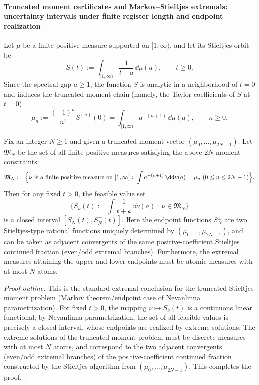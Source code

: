 \paragraph{Truncated moment certificates and Markov--Stieltjes extremals: uncertainty intervals under finite register length and endpoint realization}
Let \(\mu\) be a finite positive measure supported on \([1,\infty)\), and let its Stieltjes orbit be
\[
S(t):=\int_{[1,\infty)}\frac{1}{t+a}\,\dd\mu(a),\qquad t\ge 0.
\]
Since the spectral gap \(a\ge 1\), the function \(S\) is analytic in a neighborhood of \(t=0\) and induces the truncated moment chain (namely, the Taylor coefficients of \(S\) at \(t=0\))
\[
\mu_n:=\frac{(-1)^n}{n!}S^{(n)}(0)=\int_{[1,\infty)}a^{-(n+1)}\,\dd\mu(a),\qquad n\ge 0.
\]

\begin{proposition}\label{prop:xi-markov-stieltjes-extremal-principle}
Fix an integer \(N\ge 1\) and given a truncated moment vector \((\mu_0,\dots,\mu_{2N-1})\).
Let \(\mathfrak{M}_N\) be the set of all finite positive measures satisfying the above \(2N\) moment constraints:
\[
\mathfrak{M}_N:=\Bigl\{\nu\ \text{is a finite positive measure on \([1,\infty)\)}:\ \int a^{-(n+1)}\,\dd\nu(a)=\mu_n\ (0\le n\le 2N-1)\Bigr\}.
\]
Then for any fixed \(t>0\), the feasible value set
\[
\bigl\{S_\nu(t):=\int\frac{1}{t+a}\,\dd\nu(a)\ :\ \nu\in\mathfrak{M}_N\bigr\}
\]
is a closed interval \([S_N^{-}(t),S_N^{+}(t)]\).
Here the endpoint functions \(S_N^\pm\) are two Stieltjes-type rational functions uniquely determined by \((\mu_0,\dots,\mu_{2N-1})\), and can be taken as adjacent convergents of the same positive-coefficient Stieltjes continued fraction (even/odd extremal branches).
Furthermore, the extremal measures attaining the upper and lower endpoints must be atomic measures with at most \(N\) atoms.
\end{proposition}
\begin{proof}[Proof outline]
This is the standard extremal conclusion for the truncated Stieltjes moment problem (Markov theorem/endpoint case of Ne\-van\-lin\-na parametrization).
For fixed \(t>0\), the mapping \(\nu\mapsto S_\nu(t)\) is a continuous linear functional; by Nevanlinna parametrization, the set of all feasible values is precisely a closed interval, whose endpoints are realized by extreme solutions.
The extreme solutions of the truncated moment problem must be discrete measures with at most \(N\) atoms, and correspond to the two adjacent convergents (even/odd extremal branches) of the positive-coefficient continued fraction constructed by the Stieltjes algorithm from \((\mu_0,\dots,\mu_{2N-1})\). This completes the proof.
\end{proof}


